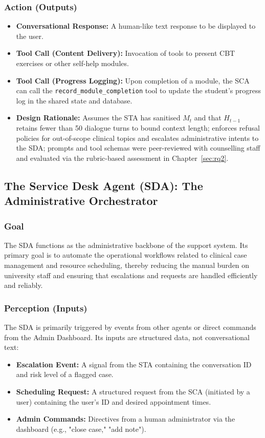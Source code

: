 \subsubsection{Action (Outputs)}
\begin{itemize}
    \item \textbf{Conversational Response:} A human-like text response to be displayed to the user.
    \item \textbf{Tool Call (Content Delivery):} Invocation of tools to present CBT exercises or other self-help modules.
    \item \textbf{Tool Call (Progress Logging):} Upon completion of a module, the SCA can call the \texttt{record\_module\_completion} tool to update the student's progress log in the shared state and database.
\end{itemize}

\begin{itemize}
    \item \textbf{Design Rationale:} Assumes the STA has sanitised $M_t$ and that $H_{t-1}$ retains fewer than 50 dialogue turns to bound context length; enforces refusal policies for out-of-scope clinical topics and escalates administrative intents to the SDA; prompts and tool schemas were peer-reviewed with counselling staff and evaluated via the rubric-based assessment in Chapter~\ref{sec:rq2}.\cite{FIND_CITATION_PLACEHOLDER}
\end{itemize}

\subsection{The Service Desk Agent (SDA): The Administrative Orchestrator}

\subsubsection{Goal}
The SDA functions as the administrative backbone of the support system. Its primary goal is to automate the operational workflows related to clinical case management and resource scheduling, thereby reducing the manual burden on university staff and ensuring that escalations and requests are handled efficiently and reliably.

\subsubsection{Perception (Inputs)}
The SDA is primarily triggered by events from other agents or direct commands from the Admin Dashboard. Its inputs are structured data, not conversational text:
\begin{itemize}
    \item \textbf{Escalation Event:} A signal from the STA containing the conversation ID and risk level of a flagged case.
    \item \textbf{Scheduling Request:} A structured request from the SCA (initiated by a user) containing the user's ID and desired appointment times.
    \item \textbf{Admin Commands:} Directives from a human administrator via the dashboard (e.g., "close case," "add note").
\end{itemize}

